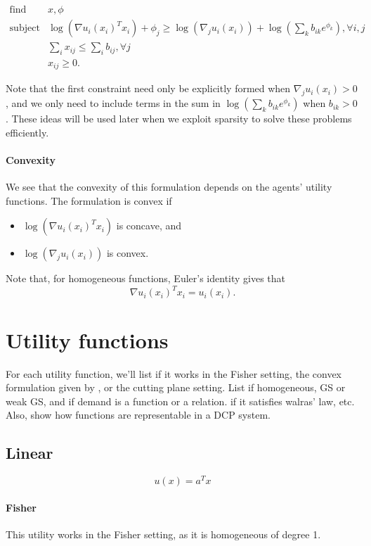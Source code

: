\documentclass{article}
\begin{document}
\[
\begin{array}{ll}
\mbox{find} & x, \phi \\
\mbox{subject to} & \log(\nabla u_i(x_i)^T x_i) + \phi_j \geq  \log(\nabla_j u_i(x_i)) +  \log(\sum_k b_{ik} e^{\phi_k}), \forall i,j\\
& \sum_i x_{ij} \leq \sum_i b_{ij}, \forall j\\
& x_{ij} \geq 0.
\end{array}
\]

Note that the first constraint need only be explicitly formed when $\nabla_j u_i(x_i) > 0$, and we only need to include terms in the sum in
$\log(\sum_k b_{ik} e^{\phi_k})$ when $b_{ik} > 0$. These ideas will be used later when we exploit sparsity to solve these problems efficiently.

\paragraph{Convexity}
We see that the convexity of this formulation depends on the agents' utility functions. The formulation is convex if
\begin{itemize}
\item $\log(\nabla u_i(x_i)^T x_i)$ is concave, and
\item $\log(\nabla_j u_i(x_i))$ is convex.
\end{itemize}
Note that, for homogeneous functions, Euler's identity gives that
\[
\nabla u_i(x_i)^T x_i = u_i(x_i).
\]

\section{Utility functions}
For each utility function, we'll list if it works in the Fisher setting, the convex formulation given by \cite{chen2010equilibrium}, or the cutting plane setting. List if homogeneous, GS or weak GS, and if demand is a function or a relation. if it satisfies walras' law, etc. Also, show how functions are representable in a DCP system.

\subsection{Linear}
\[
u(x) = a^T x
\]
\paragraph{Fisher}
This utility works in the Fisher setting, as it is homogeneous of degree 1.
\end{document}
